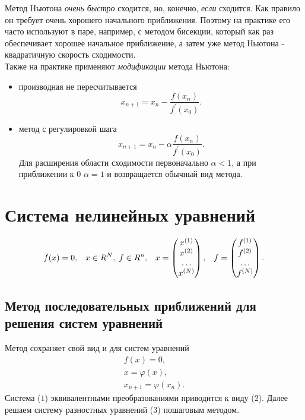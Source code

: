 \documentclass[a4paper,11pt]{article}
\begin{document}
\noindent Метод Ньютона \textit{очень быстро} сходится, но, конечно, \textit{если} сходится. Как правило он требует очень хорошего начального приближения.
Поэтому на практике его часто используют в паре, например, с методом бисекции, который как раз обеспечивает хорошее начальное приближение,
а затем уже метод Ньютона - квадратичную скорость сходимости. \\

\noindent Также на практике применяют \textit{модификации} метода Ньютона:
\begin{itemize}
  \item производная не пересчитывается \[x_{n+1} = x_n - \frac{f(x_n)}{f^{'}(x_0)}.\]
  \item метод с регулировкой шага \[x_{n+1} = x_n - \alpha\frac{f(x_n)}{f^{'}(x_0)}.\]
    Для расширения области сходимости первоначально $\alpha<1$, а при приближении к $0$ $\alpha=1$ и возвращается обычный вид метода.
\end{itemize}

\section{Система нелинейных уравнений}
\begin{align}
  f(x) = 0, && x \in R^N, \hspace{1mm}f \in R^n, && x = \begin{pmatrix} x^{(1)} \\ x^{(2)} \\ \dots \\ x^{(N)} \end{pmatrix}, &&
  f = \begin{pmatrix} f^{(1)} \\ f^{(2)} \\ \dots \\ f^{(N)} \end{pmatrix}.
\end{align}

\subsection{Метод последовательных приближений для решения систем уравнений}
Метод сохраняет свой вид и для систем уравнений
\begin{gather}
  f(x) = 0, \\
  x = \varphi(x), \\
  x_{n+1} = \varphi(x_n).
\end{gather}
Система ($1$) эквивалентными преобразованиями приводится к виду ($2$). Далее решаем систему разностных уравнений ($3$) пошаговым методом.\\
\end{document}
